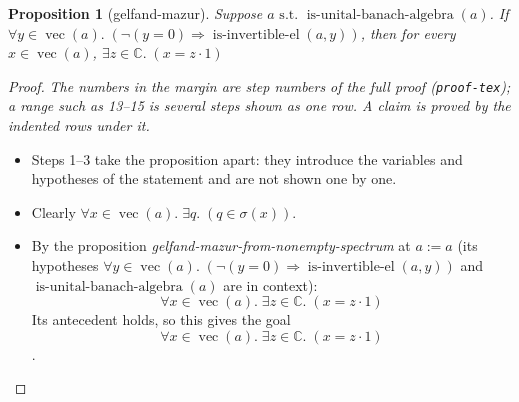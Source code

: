 \documentclass[11pt]{article}
\theoremstyle{plain}
\newtheorem*{proposition*}{Proposition}
\begin{document}
\begin{proposition*}[gelfand-mazur]
Suppose $a \text{ s.t. } \operatorname{is\text{-}unital\text{-}banach\text{-}algebra}(a)$. If $\forall y \in \operatorname{vec}(a).\; (\neg (y = 0) \Rightarrow \operatorname{is\text{-}invertible\text{-}el}(a, y))$, then for every $x \in \operatorname{vec}(a)$,  $\exists z \in \mathbb{C}.\; (x = z \cdot 1)$
\end{proposition*}

\begin{proof}
{\small\emph{The numbers in the margin are step numbers of the full proof (\texttt{proof-tex}); a range such as 13--15 is several steps shown as one row.  A claim is proved by the indented rows under it.}}\par\smallskip
\begin{itemize}[leftmargin=2.8em, itemsep=4pt, parsep=1pt]
  \item[\textbf{1--3}] Steps 1--3 take the proposition apart: they introduce the variables and hypotheses of the statement and are not shown one by one.
  \item[\textbf{4}] Clearly $\forall x \in \operatorname{vec}(a).\; \exists q.\; (q \in \sigma({x}))$.
  \item[\textbf{5--6}] By the proposition \emph{gelfand-mazur-from-nonempty-spectrum} at $a := a$ (its hypotheses $\forall y \in \operatorname{vec}(a).\; (\neg (y = 0) \Rightarrow \operatorname{is\text{-}invertible\text{-}el}(a, y))$ and $\operatorname{is\text{-}unital\text{-}banach\text{-}algebra}(a)$ are in context):
\begin{equation*}
\forall x \in \operatorname{vec}(a).\; \exists z \in \mathbb{C}.\; (x = z \cdot 1)
\end{equation*}
  Its antecedent holds, so this gives the goal
\begin{equation*}
\forall x \in \operatorname{vec}(a).\; \exists z \in \mathbb{C}.\; (x = z \cdot 1)
\end{equation*}
.
\end{itemize}
\end{proof}
\end{document}
